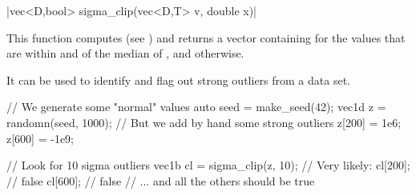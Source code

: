 \funcitem \cppinline|vec<D,bool> sigma_clip(vec<D,T> v, double x)| 

This function computes  (see ) and returns a vector containing  for the values that are within  and  of the median of , and  otherwise.

It can be used to identify and flag out strong outliers from a data set.

\begin{example}
\begin{cppcode}
// We generate some "normal" values
auto seed = make_seed(42);
vec1d z = randomn(seed, 1000);
// But we add by hand some strong outliers
z[200] = 1e6;
z[600] = -1e9;

// Look for 10 sigma outliers
vec1b cl = sigma_clip(z, 10);
// Very likely:
cl[200]; // false
cl[600]; // false
// ... and all the others should be true
\end{cppcode}
\end{example}
